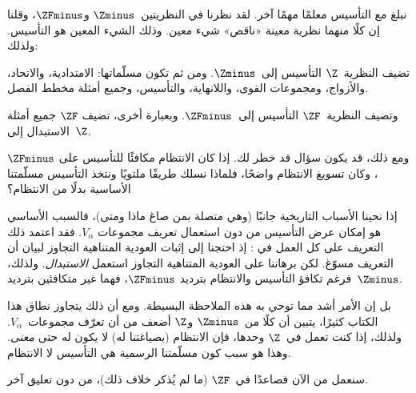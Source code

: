 \documentclass[../../../include/open-logic-section]{subfiles}
\begin{document}

نبلغ مع التأسيس معلمًا مهمًا آخر. لقد نظرنا في النظريتين~$\Zminus$
و$\ZFminus$، وقلنا إن كلًا منهما نظرية معينة «ناقص» شيء معين. وذلك
الشيء المعين هو التأسيس. ولذلك:

\begin{defn}
تضيف النظرية~$\Z$ التأسيس إلى~$\Zminus$. ومن ثم تكون مسلّماتها:
الامتدادية، والاتحاد، والأزواج، ومجموعات القوى، واللانهاية، والتأسيس،
وجميع أمثلة مخطط الفصل.

وتضيف النظرية~$\ZF$ التأسيس إلى~$\ZFminus$. وبعبارة أخرى، تضيف
$\ZF$ جميع أمثلة الاستبدال إلى~$\Z$.
\end{defn}

ومع ذلك، قد يكون سؤال قد خطر لك. إذا كان الانتظام مكافئًا للتأسيس على
$\ZFminus$، وكان تسويغ الانتظام واضحًا، فلماذا نسلك طريقًا ملتويًا
ونتخذ التأسيس مسلّمتنا الأساسية بدلًا من الانتظام؟

إذا نحينا الأسباب التاريخية جانبًا (وهي متصلة بمن صاغ ماذا ومتى)،
فالسبب الأساسي هو إمكان عرض التأسيس من دون استعمال تعريف مجموعات
$V_\alpha$. فقد اعتمد ذلك التعريف على كل العمل في
: إذ احتجنا إلى إثبات العودية المتناهية التجاوز
لبيان أن التعريف مسوّغ. لكن برهاننا على العودية المتناهية التجاوز
استعمل \emph{الاستبدال}. ولذلك، فرغم تكافؤ التأسيس والانتظام بترديد
$\ZFminus$، فهما غير متكافئين بترديد~$\Zminus$.

بل إن الأمر أشد مما توحي به هذه الملاحظة البسيطة. ومع أن ذلك يتجاوز
نطاق هذا الكتاب كثيرًا، يتبين أن كلًا من~$\Zminus$ و$\Z$ أضعف من أن
تعرّف مجموعات~$V_\alpha$. ولذلك، إذا كنت تعمل في~$\Z$ وحدها، فإن
الانتظام (بصياغتنا له) لا يكون له حتى \emph{معنى}. وهذا هو سبب كون
مسلّمتنا الرسمية هي التأسيس لا الانتظام.

سنعمل من الآن فصاعدًا في~$\ZF$ (ما لم يُذكر خلاف ذلك)، من دون تعليق
آخر.
\end{document}
